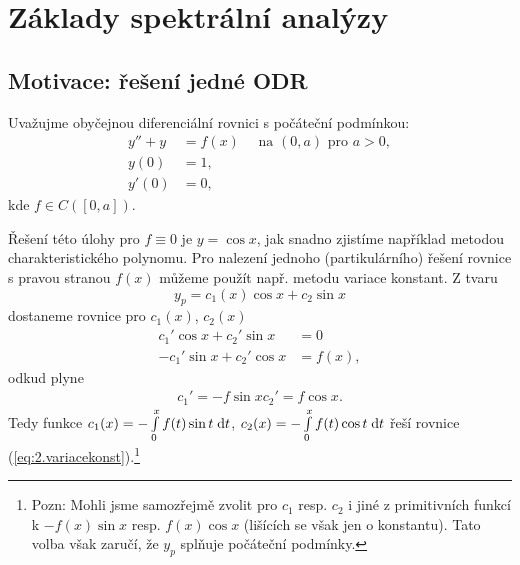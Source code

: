 



\section{Základy spektrální analýzy}

\subsection{Motivace: řešení jedné ODR}
\Priklad

Uvažujme obyčejnou diferenciální rovnici s počáteční podmínkou:
\begin{equation}
    \begin{split}
        y''+y&=f(x) \quad  \text{ na } (0,a) \text{ pro } a>0,\\
        y(0)&=1,\\
        y'(0)&=0,
    \end{split}
    \label{eq:2.zadani}
\end{equation}
kde $f\in C \left( [0, a] \right)$. 

Řešení této úlohy pro $f\equiv 0$ je $y=\cos x$, jak snadno zjistíme například metodou charakteristického polynomu. Pro nalezení jednoho (partikulárního) řešení rovnice s pravou stranou $f(x)$ můžeme použít např. metodu variace konstant. Z tvaru
\begin{equation}
    y_p=c_1(x) \cos x+c_2 \sin x
\end{equation}
dostaneme rovnice pro $c_1(x)$, $c_2(x)$
\begin{equation}
    \begin{split}
        c_1'\cos x+c_2'\sin x&=0\\
        -c_1'\sin x+c_2'\cos x&=f(x),
    \end{split}
    \label{eq:2.variacekonst}
\end{equation}
odkud plyne
\begin{equation}
    \begin{split}
        c_1'=-f \sin x
        c_2'=f\cos x.
    \end{split}
\end{equation}
Tedy funkce $ c_1(x) = -\int\limits_0^xf(t)\sin t \;\mathrm{d}t$, $ c_2(x) = -\int\limits_0^xf(t)\cos t \;\mathrm{d}t$ řeší rovnice (\ref{eq:2.variacekonst}).\footnote{Pozn: Mohli jsme samozřejmě zvolit pro $c_1$ resp. $c_2$ i jiné z primitivních funkcí k $-f(x)\sin x$ resp. $f(x) \cos x$ (lišících se však jen o konstantu). Tato volba však zaručí, že $y_p$ splňuje počáteční podmínky.}

